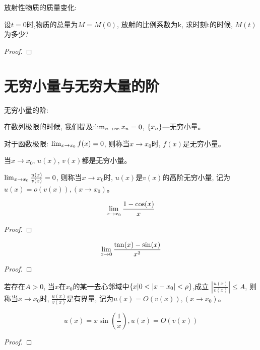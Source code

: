 \documentclass[lang=cn]{elegantbook}
\begin{document}
\begin{proposition}
    放射性物质的质量变化:

    设$t = 0$时,物质的总量为$M = M(0)$, 放射的比例系数为k, 求时刻t的时候, $M(t)$为多少?
\end{proposition}
\begin{proof}
    
\end{proof}

\section{无穷小量与无穷大量的阶}
无穷小量的阶:

在数列极限的时候, 我们提及:$\lim_{n \to \infty } x_n = 0$, $\left\{ x_n\right\}$---无穷小量。

对于函数极限:
$\lim_{x \to x_0 } f(x) = 0$, 则称当$x \to x_0$时, $f(x)$是无穷小量。

当$x \to x_0$, $u(x)$, $v(x)$都是无穷小量。

\begin{definition}
    $\lim_{x \to x_0 } \frac{u(x)}{v(x)} = 0$, 则称当$x \to x_0$时, $u(x)$是$v(x)$的高阶无穷小量, 记为$u(x) = o(v(x)), (x \to x_0)$。    
\end{definition}

\begin{proposition}
    \[ \lim_{x \to x_0 } \frac{1-\cos(x)}{x}\] 
\end{proposition}
\begin{proof}
    
\end{proof}

\begin{proposition}
    \[ \lim_{x \to 0 } \frac{\tan(x) - \sin(x)}{x^2} \]
\end{proposition}
\begin{proof}
    
\end{proof}
\begin{definition}
    若存在$A > 0$, 当$x$在$x_0$的某一去心邻域中$\left\{ x|  0 < \left| x - x_0\right| < \rho\right\}$,成立 $\left| \frac{u(x)}{v(x)} \right| \le A$, 则称当$x \to x_0$时, $\frac{u(x)}{v(x)}$是有界量, 记为$u(x) = O(v(x)), (x \to x_0)$。    
\end{definition}

\begin{proposition}
    \[u(x) = x\sin\left(\frac{1}{x}\right), u(x) = O(v(x))\]
\end{proposition}
\begin{proof}
    
\end{proof}
\end{document}

